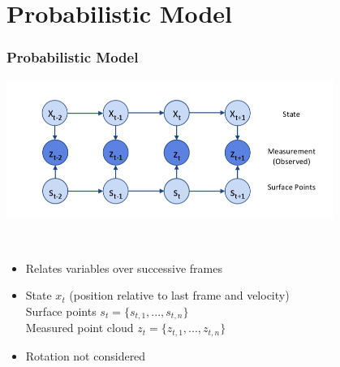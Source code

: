 \section{Probabilistic Model}

\begin{frame}
  \frametitle{Probabilistic Model}      
  \center
  \includegraphics[width=0.8\textwidth]{../img/dbn}
  {\tiny \cite{paper}}
  \begin{description}[]
  \item[Dynamic Bayesian Network] \hfill \\
  \begin{itemize}
  \item Relates variables over successive frames
  \item State $x_t$ (position relative to last frame and velocity)\\
        Surface points $s_t=\{s_{t,1},...,s_{t,n}\}$\\
        Measured point cloud $z_t=\{z_{t,1},...,z_{t,n}\}$
  \item Rotation not considered
  \end{itemize}
  \end{description}
\end{frame}


